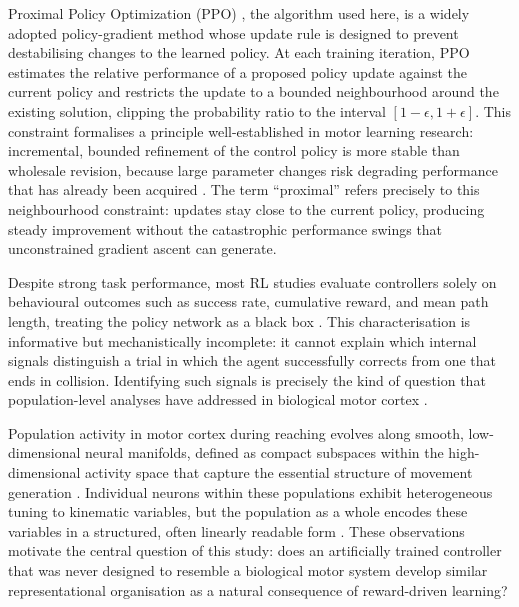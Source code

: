 \documentclass{article}
\begin{document}
Proximal Policy Optimization (PPO) \citep{Schulman2017}, the algorithm
used here, is a widely adopted policy-gradient method whose update rule is
designed to prevent destabilising changes to the learned policy.
At each training iteration, PPO estimates the relative performance of a
proposed policy update against the current policy and restricts the update
to a bounded neighbourhood around the existing solution, clipping the
probability ratio to the interval $[1-\epsilon, 1+\epsilon]$.
This constraint formalises a principle well-established in motor learning
research: incremental, bounded refinement of the control policy is more
stable than wholesale revision, because large parameter changes risk
degrading performance that has already been acquired \citep{Oby2019,SuttonBarto2018,Heald2021,Krakauer2019}.
The term ``proximal'' refers precisely to this neighbourhood constraint:
updates stay close to the current policy, producing steady improvement
without the catastrophic performance swings that unconstrained gradient
ascent can generate.

Despite strong task performance, most RL studies evaluate controllers
solely on behavioural outcomes such as success rate, cumulative reward,
and mean path length, treating the policy network as a black box
\citep{Rudin2019,Molnar2022}.
This characterisation is informative but mechanistically incomplete: it
cannot explain which internal signals distinguish a trial in which the
agent successfully corrects from one that ends in collision.
Identifying such signals is precisely the kind of question that
population-level analyses have addressed in biological motor cortex
\citep{Churchland2012,Cunningham2014,Gallego2017,Blohm2009,Blohm2012}.

Population activity in motor cortex during reaching evolves along smooth,
low-dimensional neural manifolds, defined as compact subspaces within the
high-dimensional activity space that capture the essential structure of
movement generation
\citep{Churchland2012,Shenoy2013,Cunningham2014,Gallego2017,Sadtler2014,Elsayed2016,Kaufman2014}.
Individual neurons within these populations exhibit heterogeneous tuning
to kinematic variables, but the population as a whole encodes these
variables in a structured, often linearly readable form
\citep{Oby2019,Blohm2009,Murdison2015,Georgopoulos1986,Perich2018}.
These observations motivate the central question of this study: does an
artificially trained controller that was never designed to resemble a
biological motor system develop similar representational organisation as a
natural consequence of reward-driven learning?
\end{document}
